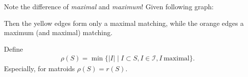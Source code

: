 \begin{example}
    Note the difference of \emph{maximal} and \emph{maximum}! Given following graph:
    \\
    \begin{minipage}{\textwidth}
        \centering
    \end{minipage}
    Then the yellow edges form only a maximal matching, while the orange edges a maximum (and maximal) matching.
\end{example}
Define
\begin{align*}
    \rho(S) = \min \{|I|\mid I \subset S, I \in \mathcal{I}, I\ \text{maximal}\}.
\end{align*}
Especially, for matroids $\rho(S)=r(S)$.

